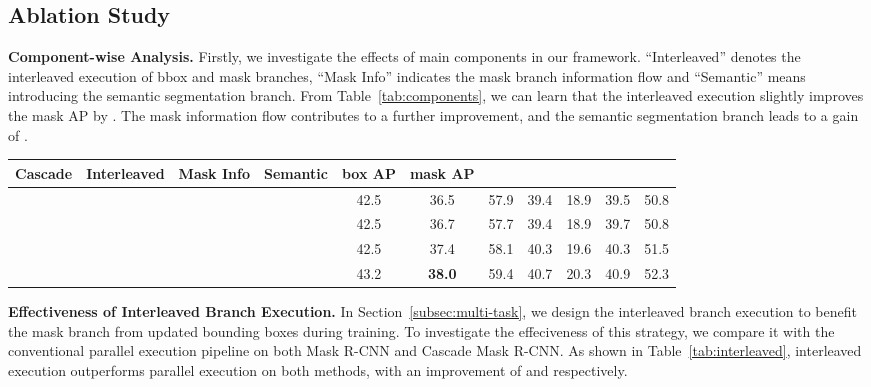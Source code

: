 \documentclass[10pt,twocolumn,letterpaper]{article}
\begin{document}
\subsection{Ablation Study}

\noindent\textbf{Component-wise Analysis.}
Firstly, we investigate the effects of main components in our framework.
``Interleaved'' denotes the interleaved execution of bbox and mask branches,
``Mask Info'' indicates the mask branch information flow and
``Semantic'' means introducing the semantic segmentation branch.
From Table~\ref{tab:components}, we can learn that the interleaved execution
slightly improves the mask AP by .
The mask information flow contributes to a further  improvement,
and the semantic segmentation branch leads to a gain of .


\begin{table*}[htb]
	\centering
	\caption{Effects of each component in our design. Results are reported on COCO 2017 val.}
	\begin{tabular}{*{4}{c}|*{7}{c}}
		\toprule
		Cascade    & Interleaved & Mask Info  & Semantic   & box AP & mask AP &  &  &  &  &  \\
		\hline
		\checkmark &             &            &            & 42.5   & 36.5    & 57.9             & 39.4             & 18.9            & 39.5            & 50.8           \\
		\checkmark & \checkmark  &            &            & 42.5   & 36.7    & 57.7             & 39.4             & 18.9            & 39.7            & 50.8           \\
		\checkmark & \checkmark  & \checkmark &            & 42.5   & 37.4    & 58.1             & 40.3             & 19.6            & 40.3            & 51.5           \\
		\checkmark & \checkmark  & \checkmark & \checkmark & 43.2   & \textbf{38.0}    & 59.4             & 40.7             & 20.3            & 40.9            & 52.3           \\
		\bottomrule
	\end{tabular}
	\label{tab:components}
\end{table*}

\noindent\textbf{Effectiveness of Interleaved Branch Execution.}
In Section~\ref{subsec:multi-task}, we design the interleaved branch execution
to benefit the mask branch from updated bounding boxes during training.
To investigate the effeciveness of this strategy, we compare it with the
conventional parallel execution pipeline on both Mask R-CNN and Cascade Mask R-CNN.
As shown in Table~\ref{tab:interleaved}, interleaved execution outperforms 
parallel execution on both methods, with an improvement of  and 
respectively.
\end{document}
